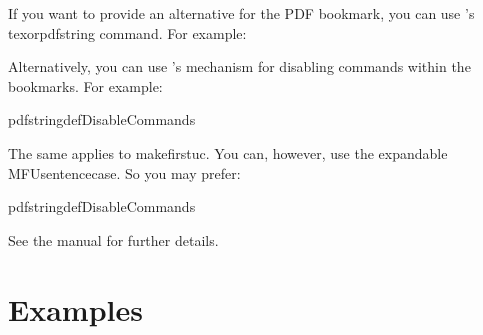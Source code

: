\documentclass[titlepage=false,oneside,
 fontsize=12pt,captions=tableheading]{scrbook}
\begin{document}
If you want to provide an alternative for the PDF bookmark, you can
use 's \gls{texorpdfstring} command. For example:
\begin{codebox}
\end{codebox}
Alternatively, you can use 's mechanism for
disabling commands within the bookmarks. For example:
\begin{codebox*}
\gls{pdfstringdefDisableCommands}
\end{codebox*}
The same applies to \gls{makefirstuc}. You can, however, use
the expandable \gls{MFUsentencecase}. So you may prefer:
\begin{codebox*}
\gls{pdfstringdefDisableCommands}
\end{codebox*}

See the  manual for further details.

\section{Examples}
\label{sec:titlecaseexamples}
\end{document}
